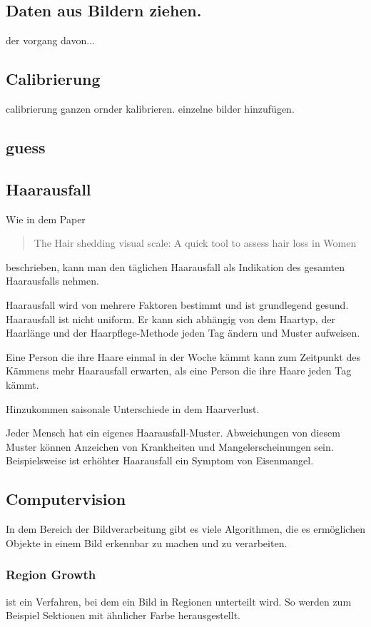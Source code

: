 \documentclass[german,a4paper,12pt]{llncs}
\begin{document}
\subsection{Daten aus Bildern ziehen.}
der vorgang davon...
\subsection{Calibrierung}
calibrierung
ganzen ornder kalibrieren. einzelne bilder hinzufügen.
\subsection{guess}





\subsection{Haarausfall}
Wie in dem Paper \blockquote{The Hair shedding visual scale: A quick tool to assess hair loss in Women} beschrieben, kann man den täglichen Haarausfall als Indikation des gesamten Haarausfalls nehmen.\cite{visualScale}

Haarausfall wird von mehrere Faktoren bestimmt und ist grundlegend gesund. Haarausfall ist nicht uniform. Er kann sich abhängig von dem Haartyp, der Haarlänge und der Haarpflege-Methode jeden Tag ändern und Muster aufweisen. 

Eine Person die ihre Haare einmal in der Woche kämmt kann zum Zeitpunkt des Kämmens mehr Haarausfall erwarten, als eine Person die ihre Haare jeden Tag kämmt. 

Hinzukommen saisonale Unterschiede in dem Haarverlust.\cite{seasoalShedding}

Jeder Mensch hat ein eigenes Haarausfall-Muster. Abweichungen von diesem Muster können Anzeichen von Krankheiten und Mangelerscheinungen sein. Beispielsweise ist erhöhter Haarausfall ein Symptom von Eisenmangel.\cite{ironDeficiency}

\subsection{Computervision}
In dem Bereich der Bildverarbeitung gibt es viele Algorithmen, die es ermöglichen Objekte in einem Bild erkennbar zu machen und zu verarbeiten.

\subsubsection{Region Growth}
ist ein Verfahren, bei dem ein Bild in Regionen unterteilt wird. So werden zum Beispiel Sektionen mit ähnlicher Farbe herausgestellt. 
\end{document}
